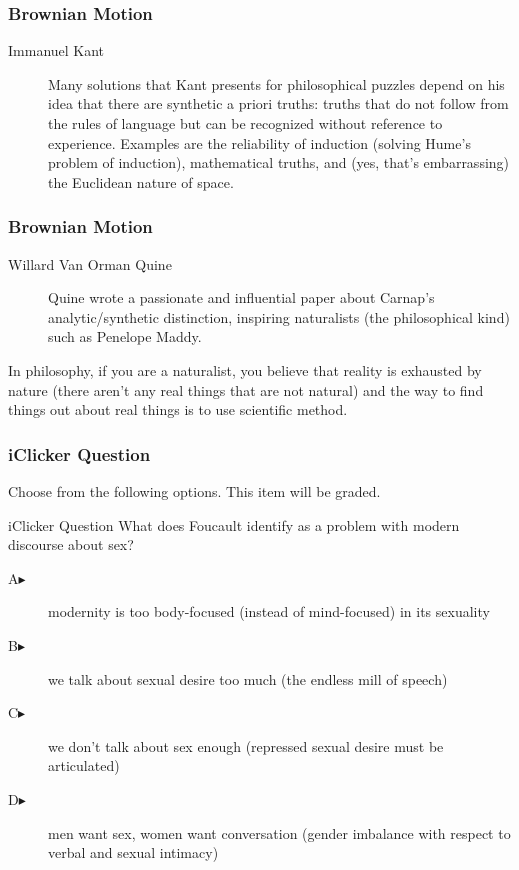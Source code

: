 \documentclass[xcolor=dvipsnames]{beamer}
\begin{document}
\begin{frame}
  \frametitle{Brownian Motion}
  \begin{description}
  \item[Immanuel Kant] Many solutions that Kant presents for philosophical
  puzzles depend on his idea that there are synthetic a priori truths:
  truths that do not follow from the rules of language but can be
  recognized without reference to experience. Examples are
  the reliability of induction (solving Hume's problem of induction),
  mathematical truths, and (yes, that's embarrassing) the Euclidean
  nature of space.
  \end{description}
\end{frame}

\begin{frame}
  \frametitle{Brownian Motion}
  \begin{description}
  \item[Willard Van Orman Quine] Quine wrote a passionate and
    influential paper about Carnap's analytic/synthetic distinction,
    inspiring naturalists (the philosophical kind) such as Penelope
    Maddy.
  \end{description}
In philosophy, if you are a naturalist, you believe that reality is
exhausted by nature (there aren't any real things that are not
natural) and the way to find things out about real things is to use
scientific method.
\end{frame}

\begin{frame}
  \frametitle{iClicker Question}
Choose from the following options. This item will be graded.
\begin{block}{iClicker Question}
What does Foucault identify as a problem with modern discourse about sex?
\end{block}
\begin{description}
\item[A\hspace{.2in}$\blacktriangleright$] modernity is too
  body-focused (instead of mind-focused) in its sexuality
\item[B\hspace{.2in}$\blacktriangleright$] we talk about sexual desire too much
  (the endless mill of speech)
\item[C\hspace{.2in}$\blacktriangleright$] we don't talk about sex
  enough (repressed sexual desire must be articulated)
\item[D\hspace{.2in}$\blacktriangleright$] men want sex, women want
  conversation (gender imbalance with respect to verbal and sexual
  intimacy)
\end{description}
\end{frame}
\end{document}
